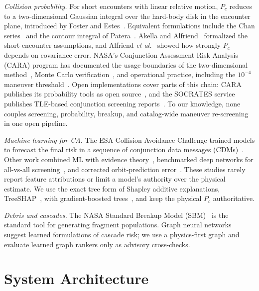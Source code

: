 \documentclass[conference]{IEEEtran}
\newcommand{\Pc}{P_c}
\begin{document}
\textit{Collision probability.} For short encounters with linear relative
motion, $\Pc$ reduces to a two-dimensional Gaussian integral over the hard-body
disk in the encounter plane, introduced by Foster and
Estes~\cite{foster1992}. Equivalent formulations include the Chan
series~\cite{chan2008} and the contour integral of Patera~\cite{patera2001}.
Akella and Alfriend~\cite{akella2000} formalized the short-encounter
assumptions, and Alfriend \textit{et al.}~\cite{alfriend1999} showed how
strongly $\Pc$ depends on covariance error. NASA's Conjunction Assessment Risk Analysis (CARA)
program has documented the usage boundaries of the two-dimensional
method~\cite{hall2019}, Monte Carlo verification~\cite{hall2018}, and
operational practice, including the $10^{-4}$ maneuver
threshold~\cite{nasa2020}. Open implementations cover parts of this chain:
CARA publishes its probability tools as open source~\cite{caratools}, and the
SOCRATES service publishes TLE-based conjunction screening
reports~\cite{kelso2006}. To our knowledge, none couples screening,
probability, breakup, and catalog-wide maneuver re-screening in one open
pipeline.

\textit{Machine learning for CA.} The ESA Collision Avoidance Challenge
trained models to forecast the final risk in a sequence of conjunction data
messages (CDMs)~\cite{uriot2022}. Other work combined ML with evidence
theory~\cite{sanchez2021}, benchmarked deep networks for all-vs-all
screening~\cite{stevenson2023}, and corrected orbit-prediction
error~\cite{peng2020}. These studies rarely report feature attributions or
limit a model's authority over the physical estimate. We use the exact tree
form of Shapley additive explanations, TreeSHAP~\cite{lundberg2020}, with
gradient-boosted trees~\cite{chen2016}, and keep the physical $\Pc$
authoritative.

\textit{Debris and cascades.} The NASA Standard Breakup Model
(SBM)~\cite{johnson2001} is the standard tool for generating fragment
populations. Graph neural networks~\cite{velickovic2018} suggest learned
formulations of cascade risk; we use a physics-first graph and evaluate learned
graph rankers only as advisory cross-checks.

\section{System Architecture}
\label{sec:arch}
\end{document}
